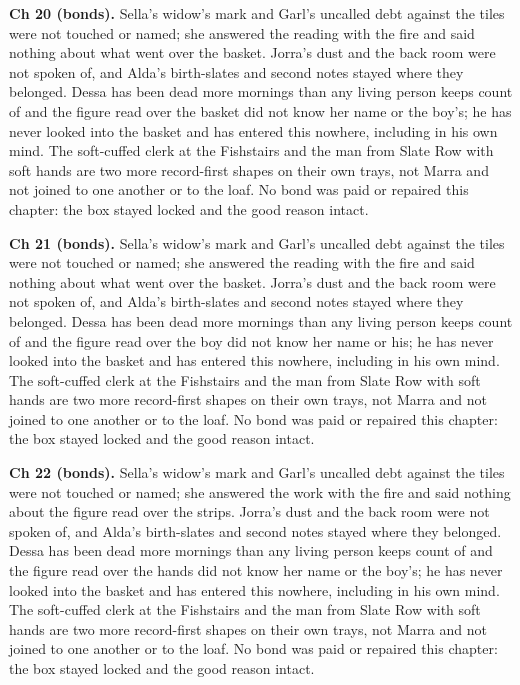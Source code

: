 \documentclass{design/chronicle}
\begin{document}
{\textbf{Ch 20 (bonds).} Sella’s widow’s mark and Garl’s uncalled debt against the tiles were not touched or named; she answered the reading with the fire and said nothing about what went over the basket. Jorra’s dust and the back room were not spoken of, and Alda’s birth-slates and second notes stayed where they belonged. Dessa has been dead more mornings than any living person keeps count of and the figure read over the basket did not know her name or the boy’s; he has never looked into the basket and has entered this nowhere, including in his own mind. The soft-cuffed clerk at the Fishstairs and the man from Slate Row with soft hands are two more record-first shapes on their own trays, not Marra and not joined to one another or to the loaf. No bond was paid or repaired this chapter: the box stayed locked and the good reason intact.

\textbf{Ch 21 (bonds).} Sella’s widow’s mark and Garl’s uncalled debt against the tiles were not touched or named; she answered the reading with the fire and said nothing about what went over the basket. Jorra’s dust and the back room were not spoken of, and Alda’s birth-slates and second notes stayed where they belonged. Dessa has been dead more mornings than any living person keeps count of and the figure read over the boy did not know her name or his; he has never looked into the basket and has entered this nowhere, including in his own mind. The soft-cuffed clerk at the Fishstairs and the man from Slate Row with soft hands are two more record-first shapes on their own trays, not Marra and not joined to one another or to the loaf. No bond was paid or repaired this chapter: the box stayed locked and the good reason intact.

\textbf{Ch 22 (bonds).} Sella’s widow’s mark and Garl’s uncalled debt against the tiles were not touched or named; she answered the work with the fire and said nothing about the figure read over the strips. Jorra’s dust and the back room were not spoken of, and Alda’s birth-slates and second notes stayed where they belonged. Dessa has been dead more mornings than any living person keeps count of and the figure read over the hands did not know her name or the boy’s; he has never looked into the basket and has entered this nowhere, including in his own mind. The soft-cuffed clerk at the Fishstairs and the man from Slate Row with soft hands are two more record-first shapes on their own trays, not Marra and not joined to one another or to the loaf. No bond was paid or repaired this chapter: the box stayed locked and the good reason intact.

}
\end{document}
